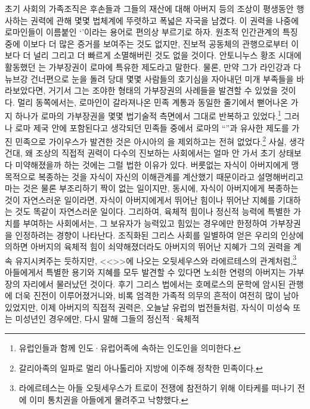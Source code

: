 초기 사회의 가족조직은
후손들과 그들의 재산에 대해
아버지 등의 조상이 평생동안 행사하는 권력에 관해
몇몇 법체계에 뚜렷하고 폭넓은 자국을 남겼다.
이 권력을 나중에 로마인들이 이름붙인
`'이라는 용어로 편의상 부르기로 하자.
원초적 인간관계의 특징 중에 이보다 더 많은 증거를 보여주는 것도 없지만,
진보적 공동체의 관행으로부터 이보다 더 널리 그리고 더 빠르게
소멸해버린 것도 없을 것이다.
안토니누스 황조 시대에 활동했던 는
가부장권이 로마에 특유한 제도라고 말한다.
물론, 만약 그가 라인강과 다뉴브강 건너편으로 눈을 돌려
당대 몇몇 사람들의 호기심을 자아내던 미개 부족들을 바라보았다면,
거기서 그는 조야한 형태의 가부장권의 사례들을 발견할 수 있었을 것이다.
멀리 동쪽에서는, 로마인이 갈라져나온 민족 계통과 동일한 줄기에서
뻗어나온 가지 하나가 로마의 가부장권을 몇몇 법기술적 측면에서
그대로 반복하고 있었다.\footnote{%
  유럽인들과 함께 인도^^b7유럽어족에 속하는 인도인을 의미한다. }
그러나
로마 제국 안에 포함된다고 생각되던 민족들 중에서
로마의 ``''과 유사한 제도를 가진 민족으로
가이우스가
발견한 것은
아시아의 을 제외하고는
전혀 없었다.\footnote{%
  갈리아족의 일파로 멀리 아나톨리아 지방에 이주해 정착한 민족이다. }
사실, 생각건대,
왜 조상의 직접적 권력이
다수의 진보하는 사회에서는
얼마 안 가서 초기 상태보다 미약해졌을까 하는 것에는
그럴 법한 이유가 있다.
버릇없는 자식이 아버지에게 맹목적으로 복종하는 것을
자식이 자신의 이해관계를 계산했기 때문이라고 설명해버리고 마는 것은
물론 부조리하기 짝이 없는 일이지만,
동시에, 자식이 아버지에게 복종하는 것이 자연스러운 일이라면,
자식이 아버지에게서 뛰어난 힘이나 뛰어난 지혜를 기대하는 것도 똑같이
자연스러운 일이다.
그리하여,
육체적 힘이나 정신적 능력에 특별한 가치를 부여하는 사회에서는,
그 보유자가 능력있고 힘있는 경우에만 한정하여
가부장권을
인정하려는 경향이 나타난다.
조직화된 그리스 사회를 일별하여 얻은 우리의 인상에 의하면
아버지의 육체적 힘이 쇠약해졌더라도 아버지의 뛰어난 지혜가
그의 권력을 계속 유지시켜주는 듯하지만,
<<>>에 나오는
오뒷세우스와 라에르테스의 관계처럼,\footnote{%
  라에르테스는 아들 오뒷세우스가 트로이 전쟁에 참전하기 위해
  이타케를 떠나기 전에 이미 통치권을 아들에게 물려주고 낙향했다.}
아들에게서 특별한 용기와 지혜를 모두 발견할 수 있다면
노쇠한 연령의 아버지는 가부장의 자리에서 물러났던 것이다.
후기 그리스 법에서는
호메로스의 문학에 암시된 관행에 더욱 진전이 이루어졌거니와,
비록 엄격한 가족적 의무의 흔적이 여전히 많이 남아있었지만,
이제 아버지의 직접적 권력은, 오늘날 유럽의 법전들처럼,
자식이 미성숙 또는 미성년인 경우에만, 다시 말해 그들의 정신적^^b7육체적
